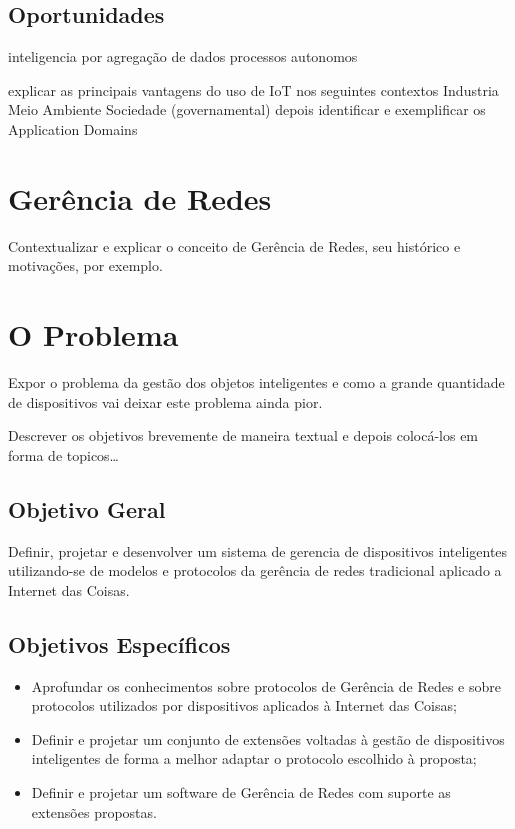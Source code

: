 \documentclass[twoside,english,brazilian]{UNISINOSmonografia}
\begin{document}
\subsection{Oportunidades}

inteligencia por agregação de dados
processos autonomos

explicar as principais vantagens do uso de IoT nos seguintes contextos
Industria
Meio Ambiente
Sociedade (governamental)
depois identificar e exemplificar os Application Domains \cite{Sundmaeker2010}


	\section{Gerência de Redes}
	
		Contextualizar e explicar o conceito de Gerência de Redes, seu 
		histórico
		e motivações, por exemplo.


\section{O Problema}

	Expor o problema da gestão dos objetos inteligentes e como a grande 
	quantidade
	de dispositivos vai deixar este problema ainda pior.
		
	Descrever os objetivos brevemente de maneira textual e depois colocá-los em
	forma de topicos\ldots


	\subsection{Objetivo Geral}
	
		Definir, projetar e desenvolver um sistema de gerencia de dispositivos 
		inteligentes utilizando-se de modelos e protocolos da gerência de 
		redes 
		tradicional aplicado a Internet das Coisas.
	
	
	\subsection{Objetivos Específicos}
	
		\begin{itemize}
			\item 
				Aprofundar os conhecimentos sobre protocolos de Gerência de 
				Redes 
				e sobre protocolos utilizados por dispositivos aplicados à 
				Internet das Coisas;
				
			\item
				Definir e projetar um conjunto de extensões voltadas à gestão 
				de dispositivos inteligentes de forma a melhor adaptar o 
				protocolo escolhido à proposta;
				
			\item
				Definir e projetar um software de Gerência de Redes com 
				suporte 
				as extensões propostas.
				
		\end{itemize}
\end{document}
